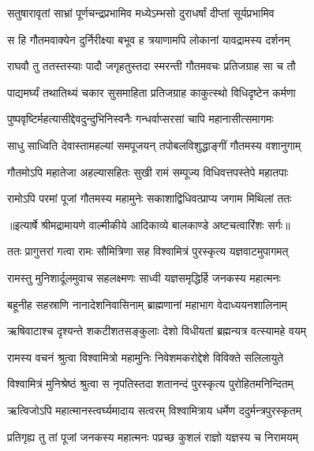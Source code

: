 \twolineshloka
{सतुषारावृतां साभ्रां पूर्णचन्द्रप्रभामिव}
{मध्येऽम्भसो दुराधर्षां दीप्तां सूर्यप्रभामिव} %

\twolineshloka
{स हि गौतमवाक्येन दुर्निरीक्ष्या बभूव ह}
{त्रयाणामपि लोकानां यावद्रामस्य दर्शनम्} %

\twolineshloka
{राघवौ तु ततस्तस्याः पादौ जगृहतुस्तदा}
{स्मरन्ती गौतमवचः प्रतिजग्राह सा च तौ} %

\twolineshloka
{पाद्यमर्घ्यं तथातिथ्यं चकार सुसमाहिता}
{प्रतिजग्राह काकुत्स्थो विधिदृष्टेन कर्मणा} %

\twolineshloka
{पुष्पवृष्टिर्महत्यासीद्देवदुन्दुभिनिस्वनैः}
{गन्धर्वाप्सरसां चापि महानासीत्समागमः} %

\twolineshloka
{साधु साध्विति देवास्तामहल्यां समपूजयन्}
{तपोबलविशुद्धाङ्गीं गौतमस्य वशानुगाम्} %

\twolineshloka
{गौतमोऽपि महातेजा अहल्यासहितः सुखी}
{रामं सम्पूज्य विधिवत्तपस्तेपे महातपाः} %

\twolineshloka
{रामोऽपि परमां पूजां गौतमस्य महामुनेः}
{सकाशाद्विधिवत्प्राप्य जगाम मिथिलां ततः} %


{॥इत्यार्षे श्रीमद्रामायणे वाल्मीकीये आदिकाव्ये बालकाण्डे अष्टचत्वारिंशः सर्गः॥}


\twolineshloka
{ततः प्रागुत्तरां गत्वा रामः सौमित्रिणा सह}
{विश्वामित्रं पुरस्कृत्य यज्ञवाटमुपागमत्} %

\twolineshloka
{रामस्तु मुनिशार्दूलमुवाच सहलक्ष्मणः}
{साध्वी यज्ञसमृद्धिर्हि जनकस्य महात्मनः} %

\twolineshloka
{बहूनीह सहस्राणि नानादेशनिवासिनाम्}
{ब्राह्मणानां महाभाग वेदाध्ययनशालिनाम्} %

\twolineshloka
{ऋषिवाटाश्च दृश्यन्ते शकटीशतसङ्कुलाः}
{देशो विधीयतां ब्रह्मन्यत्र वत्स्यामहे वयम्} %

\twolineshloka
{रामस्य वचनं श्रुत्वा विश्वामित्रो महामुनिः}
{निवेशमकरोद्देशे विविक्ते सलिलायुते} %

\twolineshloka
{विश्वामित्रं मुनिश्रेष्ठं श्रुत्वा स नृपतिस्तदा}
{शतानन्दं पुरस्कृत्य पुरोहितमनिन्दितम्} %

\twolineshloka
{ऋत्विजोऽपि महात्मानस्त्वर्घ्यमादाय सत्वरम्}
{विश्वामित्राय धर्मेण ददुर्मन्त्रपुरस्कृतम्} %

\twolineshloka
{प्रतिगृह्य तु तां पूजां जनकस्य महात्मनः}
{पप्रच्छ कुशलं राज्ञो यज्ञस्य च निरामयम्} %

